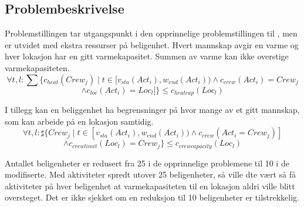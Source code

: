 \subsection{Problembeskrivelse}
Problemstillingen tar utgangspunkt i den opprinnelige problemstillingen til \bht, men er utvidet med ekstra ressurser  på beligenhet. Hvert mannskap avgir en varme og hver lokasjon har en gitt varmekapasitet. Summen av varme kan ikke overstige varmekapasiteten.
\[ \forall t,l: \sum\{c_{heat}(Crew_j) \mid t \in [ v_{sta}(Act_{i}), w_{end}(Act_{i})) \wedge c_{crew}(Act_{i}) = Crew_{j} \]
\[ \wedge c_{loc}(Act_{i}) = Loc_{l} ] \} \le c_{heatcap}(Loc_{l}) \]

I tillegg kan en beliggenhet ha begrensninger på hvor mange av et gitt mannskap, som kan arbeide på en lokasjon samtidig.
\[ \forall t,l: \sharp \{ Crew_{j} \mid  t \in [v_{sta}(Act_{i}), w_{end}(Act_{i})) \wedge c_{crew}(Act_{i} = Crew_{j})] \]
\[ \wedge c_{crewlimit}(Loc_{l}) = Crew_{j} \} \le c_{crewcapacity}(Loc_{l}) \]

Antallet beligenheter er redusert fra 25 i de opprinnelige problemene til 10 i de modifiserte. Med aktiviteter spredt utover 25 beligenheter, så ville dte vært så få aktiviteter på hver beligenhet at varmekapasiteten til en lokasjon aldri ville blitt oversteget. Det er ikke sjekket om en reduksjon til 10 beligenheter er tilstrekkelig.
